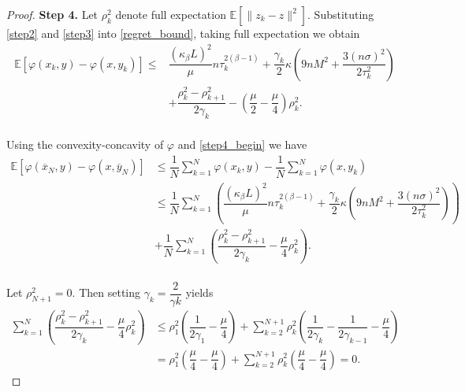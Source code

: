 \documentclass[runningheads]{llncs}
\newcommand{\E}{{\mathbb E}}
\def\E{\mathbb E}
\begin{document}
\begin{proof}
{\bf Step 4. } Let $\rho_k^2$ denote full expectation $\E[\|z_k-z\|^2]$. Substituting \eqref{step2} and \eqref{step3} into \eqref{regret_bound}, taking full expectation we obtain
\begin{equation}\label{step4_begin}
\begin{split}
     \E [\varphi(x_k, y) - \varphi(x, y_k) ]
    \leq& \dfrac{(\kappa_{\beta} L)^2}{\mu} n \tau_k^{2(\beta-1)} 
    + \dfrac{\gamma_k}{2} \kappa \left(9 n M^2  + \dfrac{3(n\sigma)^2}{2\tau_k^2} \right) \\
    & +  \dfrac{\rho_k^2 - \rho_{k+1}^2}{2\gamma_k} - \left(\dfrac{\mu}{2} - \dfrac{\mu}{4} \right) \rho_k^2 .\\
\end{split}
\end{equation}

Using the convexity-concavity of $\varphi$ and \eqref{step4_begin} we have
\begin{equation}\label{step4_mid}
\begin{split}
    \E \left[ \varphi\left(\overline{x}_N, y\right) - \varphi\left(x, \overline{y}_N\right) \right] 
    &\leq \dfrac{1}{N} \sum_{k=1}^N \varphi\left(x_k, y\right) - \dfrac{1}{N} \sum_{k=1}^N \varphi\left(x, y_k\right) \\
    & \leq \dfrac{1}{N}\sum\limits_{k=1}^N \left( \dfrac{(\kappa_{\beta} L)^2}{\mu} n \tau_k^{2(\beta-1)} 
    + \dfrac{\gamma_k}{2} \kappa \left(9 n M^2  + \dfrac{3(n\sigma)^2}{2\tau_k^2} \right) \right) \\
    & + \dfrac{1}{N} \sum\limits_{k=1}^N \left( \dfrac{\rho_k^2 - \rho_{k+1}^2}{2\gamma_k} - \dfrac{\mu}{4} \rho_k^2 \right) .\\
\end{split}
\end{equation}

Let $\rho_{N+1}^2 = 0$. Then setting $\gamma_k = \dfrac{2}{\gamma k}$ yields 
\begin{equation}\label{sum_rho}
\begin{split}
    \sum_{k=1}^{N} \left( \dfrac{\rho_k^2 - \rho_{k+1}^2}{2\gamma_k} - \dfrac{\mu}{4} \rho_k^2 \right) &\leq
    \rho_1^2 \left( \dfrac{1}{2\gamma_1} - \dfrac{\mu}{4} \right) + \sum_{k=2}^{N+1} \rho_k^2 \left( \dfrac{1}{2\gamma_k} - \dfrac {1}{2\gamma_{k-1}}- \dfrac{\mu}{4}\right) \\
    &=\rho_1^2 \left( \dfrac{\mu}{4}-\dfrac{\mu}{4} \right) + \sum_{k=2}^{N+1} \rho_k^2 \left( \dfrac{\mu}{4}-\dfrac{\mu}{4} \right) = 0.
\end{split}
\end{equation}


\end{proof}
\end{document}
